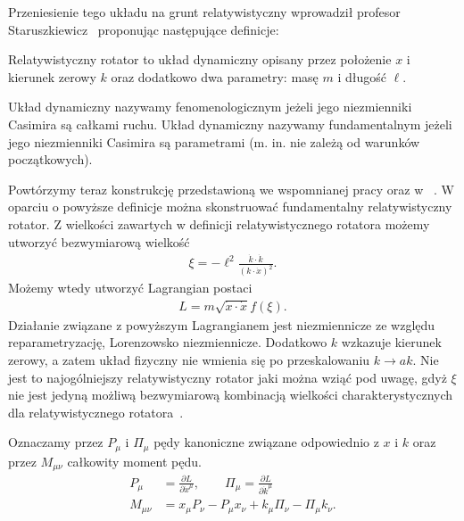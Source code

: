 Przeniesienie tego układu na grunt relatywistyczny wprowadził 
profesor Staruszkiewicz~\cite{star2008} proponując następujące 
definicje:
\begin{definition}
Relatywistyczny rotator to układ dynamiczny
 opisany przez położenie $x$ i kierunek
zerowy $k$ oraz dodatkowo dwa parametry: masę $m$ i długość $\ell$.
\end{definition}
\begin{definition}
Układ dynamiczny  nazywamy fenomenologicznym jeżeli jego niezmienniki Casimira są 
całkami ruchu. Układ dynamiczny nazywamy fundamentalnym jeżeli jego niezmienniki
Casimira są parametrami (m. in. nie zależą od warunków początkowych).
\end{definition}
Powtórzymy teraz konstrukcję przedstawioną we wspomnianej pracy oraz w
~\cite{Kassandrov2009, Bratek2009nonuniq}.
W oparciu o powyższe definicje można skonstruować fundamentalny
relatywistyczny rotator. Z wielkości zawartych w definicji relatywistycznego 
rotatora możemy utworzyć bezwymiarową wielkość
\begin{align*}
\xi = - \ell^2 \frac{\dot{k} \cdot \dot{k}}{ ( k \cdot \dot{x})^2 }.
\end{align*}
Możemy wtedy utworzyć Lagrangian postaci
\begin{align}\label{rotatorStar}
L = m \sqrt{ \dot{x} \cdot \dot{x} } f( \xi ) .
\end{align}
Działanie związane z powyższym Lagrangianem 
jest niezmiennicze ze względu reparametryzację, 
Lorenzowsko niezmiennicze. Dodatkowo $k$ wzkazuje kierunek zerowy, a zatem
 układ fizyczny nie wmienia się
po przeskalowaniu $k \to a k$. 
Nie jest to najogólniejszy relatywistyczny 
rotator jaki można wziąć pod uwagę, gdyż $\xi$ nie jest jedyną 
możliwą bezwymiarową kombinacją wielkości charakterystycznych 
dla relatywistycznego rotatora~\cite{Bratek2009nonuniq}.


Oznaczamy przez $P_\mu$ i $\Pi_\mu$ pędy kanoniczne związane 
odpowiednio z $x$ i $k$ oraz przez $M_{\mu\nu}$ całkowity moment pędu.
\begin{align*}
P_\mu &= \frac{\partial L}{\partial \dot{x}^\mu}, \qquad
\Pi_\mu = \frac{\partial L}{\partial \dot{k}^\mu} \\
M_{\mu\nu} &= x_\mu P_\nu - P_\mu x_\nu + k_\mu \Pi_\nu - \Pi_\mu k_\nu.
\end{align*}

